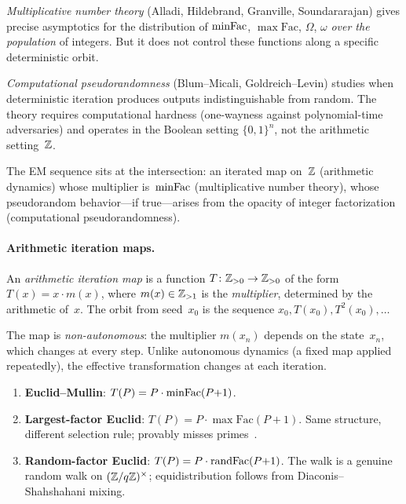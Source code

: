 \emph{Multiplicative number theory} (Alladi, Hildebrand, Granville,
Soundararajan) gives precise asymptotics for the distribution of
$\mathrm{minFac}$, $\max\mathrm{Fac}$, $\Omega$, $\omega$ \emph{over the
population} of integers.  But it does not control these functions along
a specific deterministic orbit.

\emph{Computational pseudorandomness} (Blum--Micali, Goldreich--Levin)
studies when deterministic iteration produces outputs
indistinguishable from random.  The theory requires computational
hardness (one-wayness against polynomial-time adversaries) and operates
in the Boolean setting $\{0,1\}^n$, not the arithmetic setting~$\mathbb{Z}$.

The EM sequence sits at the intersection: an iterated map on~$\mathbb{Z}$
(arithmetic dynamics) whose multiplier is~$\mathrm{minFac}$ (multiplicative
number theory), whose pseudorandom behavior---if true---arises from
the opacity of integer factorization (computational pseudorandomness).

\paragraph{Arithmetic iteration maps.}

\begin{definition}
\label{def:aim}
An \emph{arithmetic iteration map} is a function
$T \colon \mathbb{Z}_{>0} \to \mathbb{Z}_{>0}$ of the form $T(x) = x \cdot m(x)$,
where $m(x) \in \mathbb{Z}_{>1}$ is the \emph{multiplier}, determined by the
arithmetic of~$x$.  The orbit from seed~$x_0$ is the sequence
$x_0, T(x_0), T^2(x_0), \ldots$
\end{definition}

\noindent The map is \emph{non-autonomous}: the multiplier $m(x_n)$
depends on the state~$x_n$, which changes at every step.  Unlike
autonomous dynamics (a fixed map applied repeatedly), the effective
transformation changes at each iteration.

\begin{example}
\begin{enumerate}[nosep]
\item \textbf{Euclid--Mullin}: $T(P) = P \cdot \mathrm{minFac}(P{+}1)$.
\item \textbf{Largest-factor Euclid}: $T(P) = P \cdot \max\mathrm{Fac}(P{+}1)$.
  Same structure, different selection rule; provably misses
  primes~\cite{CoxVdP1968}.
\item \textbf{Random-factor Euclid}: $T(P) = P \cdot
  \mathrm{rand\-Fac}(P{+}1)$.  The walk is a genuine random walk on
  $(\mathbb{Z}/q\mathbb{Z})^\times$; equidistribution follows from
  Diaconis--Shahshahani mixing.
\end{enumerate}
\end{example}

